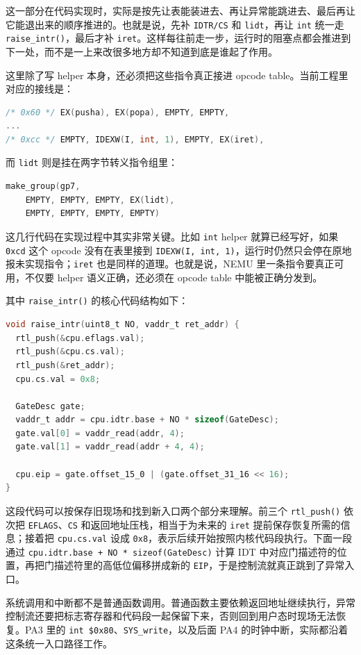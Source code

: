 \documentclass[a4paper]{article}
\begin{document}
这一部分在代码实现时，实际是按先让表能装进去、再让异常能跳进去、最后再让它能退出来的顺序推进的。也就是说，先补 \texttt{IDTR/CS} 和 \texttt{lidt}，再让 \texttt{int} 统一走 \texttt{raise\_intr()}，最后才补 \texttt{iret}。这样每往前走一步，运行时的阻塞点都会推进到下一处，而不是一上来改很多地方却不知道到底是谁起了作用。

这里除了写 helper 本身，还必须把这些指令真正接进 opcode table。当前工程里对应的接线是：
\begin{lstlisting}[language=C]
/* 0x60 */ EX(pusha), EX(popa), EMPTY, EMPTY,
...
/* 0xcc */ EMPTY, IDEXW(I, int, 1), EMPTY, EX(iret),
\end{lstlisting}

而 \texttt{lidt} 则是挂在两字节转义指令组里：
\begin{lstlisting}[language=C]
make_group(gp7,
    EMPTY, EMPTY, EMPTY, EX(lidt),
    EMPTY, EMPTY, EMPTY, EMPTY)
\end{lstlisting}

这几行代码在实现过程中其实非常关键。比如 \texttt{int} helper 就算已经写好，如果 \texttt{0xcd} 这个 opcode 没有在表里接到 \texttt{IDEXW(I, int, 1)}，运行时仍然只会停在原地报未实现指令；\texttt{iret} 也是同样的道理。也就是说，NEMU 里一条指令要真正可用，不仅要 helper 语义正确，还必须在 opcode table 中能被正确分发到。

其中 \texttt{raise\_intr()} 的核心代码结构如下：
\begin{lstlisting}[language=C]
void raise_intr(uint8_t NO, vaddr_t ret_addr) {
  rtl_push(&cpu.eflags.val);
  rtl_push(&cpu.cs.val);
  rtl_push(&ret_addr);
  cpu.cs.val = 0x8;

  GateDesc gate;
  vaddr_t addr = cpu.idtr.base + NO * sizeof(GateDesc);
  gate.val[0] = vaddr_read(addr, 4);
  gate.val[1] = vaddr_read(addr + 4, 4);

  cpu.eip = gate.offset_15_0 | (gate.offset_31_16 << 16);
}
\end{lstlisting}

这段代码可以按保存旧现场和找到新入口两个部分来理解。前三个 \texttt{rtl\_push()} 依次把 \texttt{EFLAGS}、\texttt{CS} 和返回地址压栈，相当于为未来的 \texttt{iret} 提前保存恢复所需的信息；接着把 \texttt{cpu.cs.val} 设成 \texttt{0x8}，表示后续开始按照内核代码段执行。下面一段通过 \texttt{cpu.idtr.base + NO * sizeof(GateDesc)} 计算 IDT 中对应门描述符的位置，再把门描述符里的高低位偏移拼成新的 \texttt{EIP}，于是控制流就真正跳到了异常入口。

系统调用和中断都不是普通函数调用。普通函数主要依赖返回地址继续执行，异常控制流还要把标志寄存器和代码段一起保留下来，否则回到用户态时现场无法恢复。PA3 里的 \texttt{int \$0x80}、\texttt{SYS\_write}，以及后面 PA4 的时钟中断，实际都沿着这条统一入口路径工作。
\end{document}

